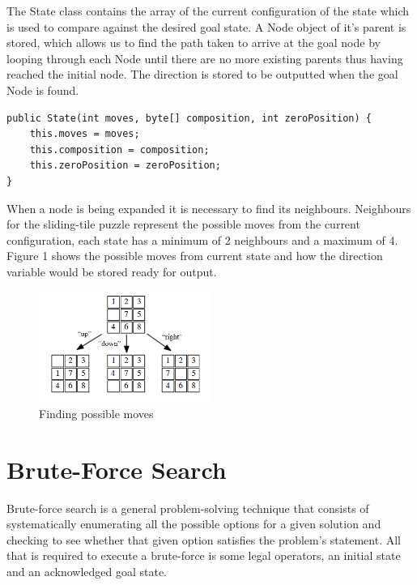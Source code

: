 \documentclass[progress]{cmpreport}
\begin{document}
The State class contains the array of the current configuration of the state which is used to compare against the  desired goal state. A Node object of it's parent is stored, which allows us to find the path taken to arrive at the goal node by looping through each Node until there are no more existing parents thus having reached the initial node. The direction is stored to be outputted when the goal Node is found.     

\begin{verbatim}
public State(int moves, byte[] composition, int zeroPosition) {
    this.moves = moves;
    this.composition = composition;
    this.zeroPosition = zeroPosition;
}

\end{verbatim}
When a node is being expanded it is necessary to find its neighbours. Neighbours for the sliding-tile puzzle represent the possible moves from the current configuration, each state has a minimum of 2 neighbours and a maximum of 4. Figure 1 shows the possible moves from current state and how the direction variable would be stored ready for output. 

\begin{figure}[ht]
	\centering
	\includegraphics[width=0.5\textwidth]{moves}
	\captionsetup{justification=centering}
	\caption{Finding possible moves}
\end{figure}


\section{Brute-Force Search}
Brute-force search is a general problem-solving technique that consists of systematically enumerating all the possible options for a given solution and checking to see whether that given option satisfies the problem's statement. All that is required to execute a brute-force is some legal operators, an initial state and an acknowledged goal state. 
\end{document}
